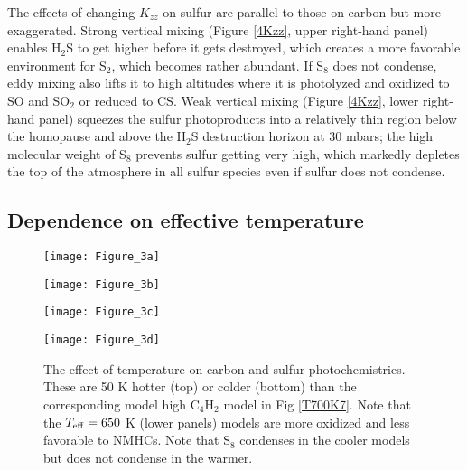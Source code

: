 \documentclass[preprint]{aastex}
\begin{document}
The effects of changing $K_{zz}$ on sulfur are parallel to those on carbon but more exaggerated. 
Strong vertical mixing (Figure \ref{4Kzz}, upper right-hand panel) enables H$_2$S to get higher before it gets destroyed,
which creates a more favorable environment for S$_2$, which becomes rather abundant.
If S$_8$ does not condense,
eddy mixing also lifts it to high altitudes where it is photolyzed and oxidized to SO and SO$_2$ or reduced to CS. 
Weak vertical mixing (Figure \ref{4Kzz}, lower right-hand panel) squeezes the sulfur photoproducts into a relatively thin region below
the homopause and above the H$_2$S destruction horizon at 30 mbars; 
the high molecular weight of S$_8$ prevents sulfur getting very high, which markedly depletes the top of the
atmosphere in all sulfur species even if sulfur does not condense. 


\subsection{Dependence on effective temperature}

\begin{figure}[!htb]
 \centering
 \begin{minipage}[c]{0.49\textwidth}
   \centering
  \texttt{[image: Figure\_3a]} 
 \end{minipage}
 \begin{minipage}[c]{0.49\textwidth}
   \centering
 \texttt{[image: Figure\_3b]} 
 \end{minipage}
 \centering
 \begin{minipage}[c]{0.49\textwidth}
   \centering
 \texttt{[image: Figure\_3c]} 
 \end{minipage}
 \begin{minipage}[c]{0.49\textwidth}
   \centering
 \texttt{[image: Figure\_3d]} 
 \end{minipage}
 \caption{\small The effect of temperature on carbon and sulfur photochemistries. 
  These are 50 K hotter (top) or colder (bottom) than the corresponding model high C$_4$H$_2$ model in Fig \ref{T700K7}.
  Note that the $T_{\rm eff}=650$ K (lower panels) models are more oxidized and
  less favorable to NMHCs. Note that S$_8$ condenses in the cooler models
  but does not condense in the warmer.}
\label{4Temp}
\end{figure}
\end{document}
